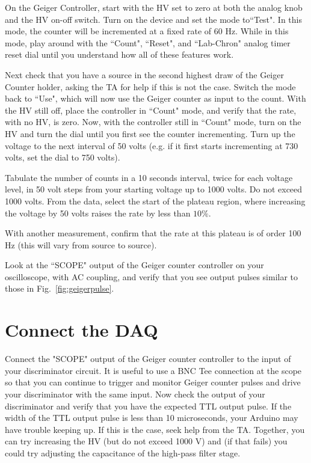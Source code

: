 \documentclass[12pt]{article}
\begin{document}
On the Geiger Controller, start with the HV set to zero at both the analog knob and the HV on-off switch.   Turn on the device and set the mode to``Test".  In this mode, the counter will be incremented at a fixed rate of 60 Hz.   While in this mode, play around with the ``Count", ``Reset", and ``Lab-Chron" analog timer reset dial until you understand how all of these features work.

Next check that you have a source in the second highest draw of the Geiger Counter holder, asking the TA for help if this is not the case.  Switch the mode back to ``Use", which will now use the Geiger counter as input to the count.  With the HV still off, place the controller in ``Count" mode, and verify that the rate, with no HV, is zero.  Now, with the controller still in ``Count" mode, turn on the HV and turn the dial until you first see the counter incrementing.  Turn up the voltage to the next interval of 50 volts (e.g. if it first starts incrementing at 730 volts, set the dial to 750 volts).

Tabulate the number of counts in a 10 seconds interval, twice for each voltage level, in 50 volt steps from your starting voltage up to 1000 volts.  Do not exceed 1000 volts.  From the data, select the start of the plateau region, where increasing the voltage by 50 volts raises the rate by less than $10\%$.

With another measurement, confirm that the rate at this plateau is of order 100 Hz (this will vary from source to source).

Look at the ``SCOPE" output of the Geiger counter controller on your oscilloscope, with AC coupling, and verify that you see output pulses similar to those in Fig.~\ref{fig:geigerpulse}.

\section{Connect the DAQ}

Connect the "SCOPE" output of the Geiger counter controller to the input of your discriminator circuit.  It is useful to use a BNC Tee connection at the scope so that you can continue to trigger and monitor Geiger counter pulses and drive your discriminator with the same input.  Now check the output of your discriminator and verify that you have the expected TTL output pulse.  If the width of the TTL output pulse is less than 10 microseconds, your Arduino may have trouble keeping up.   If this is the case, seek help from the TA.  Together, you can try increasing the HV (but do not exceed 1000 V) and (if that fails) you could try adjusting the capacitance of the high-pass filter stage.
\end{document}
